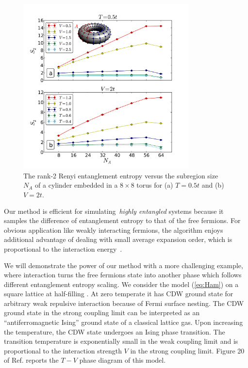 \documentclass[twocolumn,english,prl,showpacs]{revtex4}
\begin{document}
\begin{figure}[t]
\centering
\includegraphics[width=9cm]{scanNA.pdf}
\caption{The rank-2 Renyi entanglement entropy versus the subregion size $N_{A}$ of a cylinder embedded in a $8\times8$ torus for (a) $T=0.5t$ and (b) $V=2t$.}
\label{fig:scanNA}
\end{figure}

Our method is efficient for simulating~\emph{highly entangled} systems because it samples the difference of entanglement entropy to that of the free fermions. For obvious application like weakly interacting fermions, the algorithm enjoys additional advantage of dealing with small average expansion order, which is proportional to the interaction energy~\cite{Rubtsov:2005iw, Gull:2011jd}. 

We will demonstrate the power of our method with a more challenging example, where interaction turns the free fermions state into another phase which follows different entanglement entropy scaling. We consider the model (\ref{eq:Ham}) on a square lattice at half-filling \cite{PhysRevB.29.5253, Gubernatis:1985wo}. At zero temperate it has CDW ground state for arbitrary weak repulsive interaction because of Fermi surface nesting. The CDW ground state in the strong coupling limit can be interpreted as an  ``antiferromagnetic Ising'' ground state of a classical lattice gas. Upon increasing the temperature, the CDW state undergoes an Ising phase transition. The transition temperature is exponentially small in the weak coupling limit and is proportional to the interaction strength $V$ in the strong coupling limit.  Figure 20 of Ref.\cite{Gubernatis:1985wo} reports the $T-V$ phase diagram of this model. 
\end{document}

